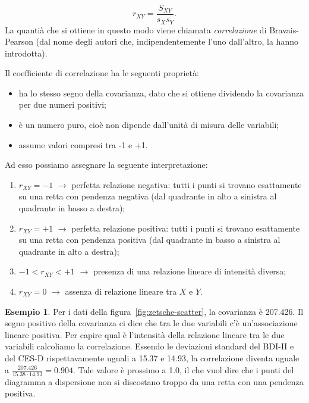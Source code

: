 \documentclass[
  11pt,
  italian,
  a4paper,
  extrafontsizes,onecolumn,openright
  ]{memoir}
\providecommand{\tightlist}{%
  \setlength{\itemsep}{0pt}\setlength{\parskip}{0pt}}
\newlength{\rf}
\theoremstyle{definition}
\theoremstyle{definition}
\newtheorem{example}{Esempio}[chapter]
\theoremstyle{definition}
\theoremstyle{definition}
\theoremstyle{remark}
\begin{document}
\begin{equation}
r_{XY} = \frac{S_{XY}}{s_X s_Y}.
\label{eq:correlation}
\end{equation}
La quantià che si ottiene in questo modo viene chiamata \emph{correlazione} di Bravais-Pearson (dal nome degli autori che, indipendentemente l'uno dall'altro, la hanno introdotta).

Il coefficiente di correlazione ha le seguenti proprietà:

\begin{itemize}
\tightlist
\item
  ha lo stesso segno della covarianza, dato che si ottiene dividendo
  la covarianza per due numeri positivi;
\item
  è un numero puro, cioè non dipende dall'unità di misura delle
  variabili;
\item
  assume valori compresi tra -1 e +1.
\end{itemize}

Ad esso possiamo assegnare la seguente interpretazione:

\begin{enumerate}
\def\labelenumi{\arabic{enumi}.}
\tightlist
\item
  \(r_{XY} = -1\) \(\rightarrow\) perfetta relazione negativa: tutti i
  punti si trovano esattamente su una retta con pendenza negativa (dal
  quadrante in alto a sinistra al quadrante in basso a destra);
\item
  \(r_{XY} = +1\) \(\rightarrow\) perfetta relazione positiva: tutti i
  punti si trovano esattamente su una retta con pendenza positiva (dal
  quadrante in basso a sinistra al quadrante in alto a destra);
\item
  \(-1 < r_{XY} < +1\) \(\rightarrow\) presenza di una relazione lineare
  di intensità diversa;
\item
  \(r_{XY} = 0\) \(\rightarrow\) assenza di relazione lineare tra \(X\) e
  \(Y\).
\end{enumerate}

\begin{example}
Per i dati della figura~\ref{fig:zetsche-scatter}, la covarianza è 207.426. Il segno positivo della covarianza ci dice che tra le due variabili c'è un'associazione lineare positiva. Per capire qual è l'intensità della relazione lineare tra le due variabili calcoliamo la correlazione.
Essendo le deviazioni standard del BDI-II e del CES-D rispettavamente uguali a 15.37 e 14.93, la correlazione diventa uguale a \(\frac{207.426}{15.38 \cdot 14.93} = 0.904.\) Tale valore è prossimo a 1.0, il che vuol dire che i punti del diagramma a dispersione non si discostano troppo da una retta con una pendenza positiva.
\end{example}
\end{document}
